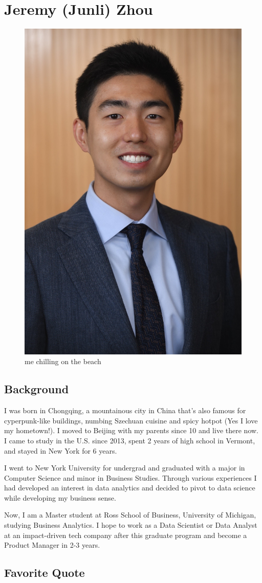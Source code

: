 \documentclass[
]{book}
\begin{document}
\hypertarget{jeremy-junli-zhou}{%
\section{Jeremy (Junli) Zhou}\label{jeremy-junli-zhou}}

\begin{figure}
\includegraphics[width=0.3\linewidth]{_pictures/about_us/Jeremy} \caption{me chilling on the beach}\label{fig:unnamed-chunk-1}
\end{figure}

\hypertarget{background-1}{%
\subsection{Background}\label{background-1}}

I was born in Chongqing, a mountainous city in China that's also famous for cyperpunk-like buildings, numbing Szechuan cuisine and spicy hotpot (Yes I love my hometown!). I moved to Beijing with my parents since 10 and live there now. I came to study in the U.S. since 2013, spent 2 years of high school in Vermont, and stayed in New York for 6 years.

I went to New York University for undergrad and graduated with a major in Computer Science and minor in Business Studies. Through various experiences I had developed an interest in data analytics and decided to pivot to data science while developing my business sense.

Now, I am a Master student at Ross School of Business, University of Michigan, studying Business Analytics. I hope to work as a Data Scientist or Data Analyst at an impact-driven tech company after this graduate program and become a Product Manager in 2-3 years.

\hypertarget{favorite-quote}{%
\subsection{Favorite Quote}\label{favorite-quote}}
\end{document}
